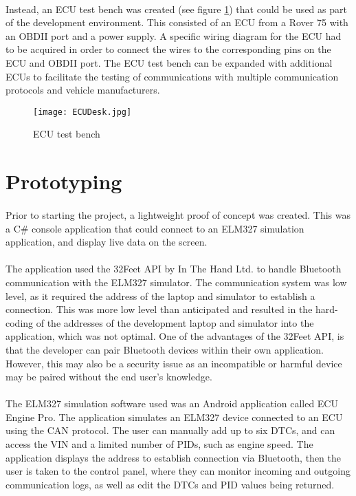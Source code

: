 	\paragraph{}{
	Instead, an ECU test bench was created (see figure \ref{fig:TestBench}) that could be used as part of the development environment. This consisted of an ECU from a Rover 75 with an OBDII port and a power supply. A specific wiring diagram for the ECU had to be acquired in order to connect the wires to the corresponding pins on the ECU and OBDII port. The ECU test bench can be expanded with additional ECUs to facilitate the testing of communications with multiple communication protocols and vehicle manufacturers.
	}
	\begin{figure}[h]
		\begin{center}										
				\texttt{[image: ECUDesk.jpg]}
				\caption{ECU test bench}
				\label{fig:TestBench}
		\end{center}
	\end{figure}

\section{Prototyping}
	\paragraph{}{
	Prior to starting the project, a lightweight proof of concept was created. This was a C{\#} console application that could connect to an ELM327 simulation application, and display live data on the screen. 
	}
	\paragraph{}{ %
	The application used the 32Feet API by In The Hand Ltd. to handle Bluetooth communication with the ELM327 simulator. The communication system was low level, as it required the address of the laptop and simulator to establish a connection. This was more low level than anticipated and resulted in the hard-coding of the addresses of the development laptop and simulator into the application, which was not optimal. One of the advantages of the 32Feet API, is that the developer can pair Bluetooth devices within their own application. However, this may also be a security issue as an incompatible or harmful device may be paired without the end user's knowledge.
	}
	\paragraph{}{
	The ELM327 simulation software used was an Android application called ECU Engine Pro. The application simulates an ELM327 device connected to an ECU using the CAN protocol. The user can manually add up to six DTCs, and can access the VIN and a limited number of PIDs, such as engine speed. The application displays the address to establish connection via Bluetooth, then the user is taken to the control panel, where they can monitor incoming and outgoing communication logs, as well as edit the DTCs and PID values being returned.
	}
